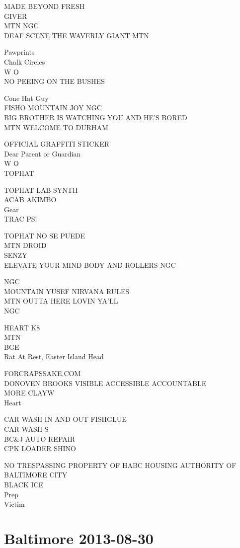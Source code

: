 \documentclass[10pt,letterpaper]{article}
\begin{document}
MADE BEYOND FRESH\\
GIVER\\
MTN NGC\\
DEAF SCENE THE WAVERLY GIANT MTN

Pawprints\\
Chalk Circles\\
W O\\
NO PEEING ON THE BUSHES

Cone Hat Guy\\
FISHO MOUNTAIN JOY NGC\\
BIG BROTHER IS WATCHING YOU AND HE'S BORED\\
MTN WELCOME TO DURHAM

OFFICIAL GRAFFITI STICKER\\
Dear Parent or Guardian\\
W O\\
TOPHAT

TOPHAT LAB SYNTH\\
ACAB AKIMBO\\
Gear\\
TRAC PS!

TOPHAT NO SE PUEDE\\
MTN DROID\\
SENZY\\
ELEVATE YOUR MIND BODY AND ROLLERS NGC

NGC\\
MOUNTAIN YUSEF NIRVANA RULES\\
MTN OUTTA HERE LOVIN YA'LL\\
NGC

HEART K8\\
MTN\\
BGE\\
Rat At Rest, Easter Island Head

FORCRAPSSAKE.COM\\
DONOVEN BROOKS VISIBLE ACCESSIBLE ACCOUNTABLE\\
MORE CLAYW\\
Heart

CAR WASH IN AND OUT FISHGLUE\\
CAR WASH S\\
BC\&J AUTO REPAIR\\
CPK LOADER SHINO

NO TRESPASSING PROPERTY OF HABC HOUSING AUTHORITY OF BALTIMORE CITY\\
BLACK ICE\\
Prep\\
Victim


\section*{Baltimore 2013-08-30}
\end{document}
